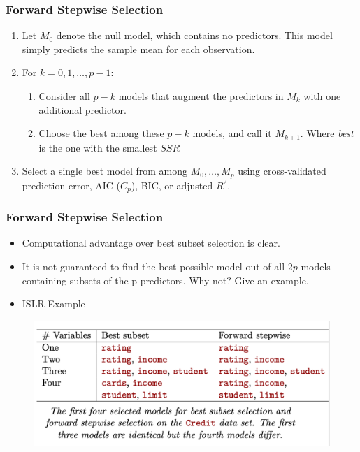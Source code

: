 \documentclass[
  shownotes,
  xcolor={svgnames},
  hyperref={colorlinks,citecolor=DarkBlue,linkcolor=DarkRed,urlcolor=DarkBlue}
  ]{beamer}
\begin{document}
\begin{frame}[fragile]
\frametitle{Forward Stepwise Selection}

\begin{enumerate}
\item Let $M_0$ denote the null model, which contains no predictors. This model simply predicts the sample mean for each observation.
\bigskip

\item  For $k=0,1,\dots,p-1$:
\medskip
\begin{enumerate}
\item Consider all $p-k$  models that augment the predictors in $M_k$ with one additional predictor.
\medskip
\item Choose the best among these $p - k$ models, and call it $M_{k+1}$. Where {\it best} is the one with the smallest $SSR$
\end{enumerate}
\bigskip
\item Select a single best model from among $M_0,\dots, M_p$ using cross-validated prediction error, AIC ($C_p$), BIC, or adjusted $R^2$.
\end{enumerate}

\end{frame}
\begin{frame}[fragile]
\frametitle{Forward Stepwise Selection}


\begin{itemize}
\item Computational advantage over best subset selection is clear.
\item  It is not guaranteed to find the best possible model out of all $2p$ models containing subsets of the p predictors. Why not? Give an example.
\item ISLR Example
\end{itemize}

\begin{figure}[H] \centering
            \captionsetup{justification=centering}
              \includegraphics[scale=0.4]{figures/Fig2}
 \end{figure}
\end{frame}
\end{document}

